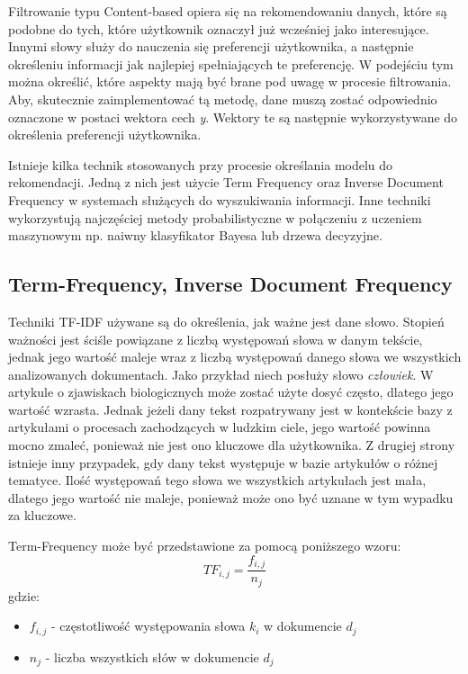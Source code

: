 Filtrowanie typu Content-based opiera się na rekomendowaniu danych, które są podobne do tych, które użytkownik oznaczył już wcześniej jako interesujące. Innymi słowy służy do nauczenia się preferencji użytkownika, a następnie określeniu informacji jak najlepiej spełniających te preferencję. W podejściu tym można określić, które aspekty mają być brane pod uwagę w procesie filtrowania. Aby, skutecznie zaimplementować tą metodę, dane muszą zostać odpowiednio oznaczone w postaci wektora cech \textit{y}. Wektory te są następnie wykorzystywane do określenia preferencji użytkownika.

Istnieje kilka technik stosowanych przy procesie określania modelu do rekomendacji. Jedną z nich jest użycie Term Frequency oraz Inverse Document Frequency w systemach służących do wyszukiwania informacji. Inne techniki wykorzystują najczęściej metody probabilistyczne w połączeniu z uczeniem maszynowym np. naiwny klasyfikator Bayesa lub drzewa decyzyjne.

\subsection{Term-Frequency, Inverse Document Frequency}
Techniki TF-IDF używane są do określenia, jak ważne jest dane słowo. Stopień ważności jest ściśle powiązane z liczbą występowań słowa w danym tekście, jednak jego wartość maleje wraz z liczbą występowań danego słowa we wszystkich analizowanych dokumentach. Jako przykład niech posłuży słowo \textit{człowiek}. W artykule o zjawiskach biologicznych może zostać użyte dosyć często, dlatego jego wartość wzrasta. Jednak jeżeli dany tekst rozpatrywany jest w kontekście bazy z artykułami o procesach zachodzących w ludzkim ciele, jego wartość powinna mocno zmaleć, ponieważ nie jest ono kluczowe dla użytkownika. Z drugiej strony istnieje inny przypadek, gdy dany tekst występuje w bazie artykułów o różnej tematyce. Ilość występowań tego słowa we wszystkich artykułach jest mała, dlatego jego wartość nie maleje, ponieważ może ono być uznane w tym wypadku za kluczowe.

Term-Frequency może być przedstawione za pomocą poniższego wzoru:
\begin{equation}
 TF_{i,j} = \frac{f_{i,j}}{n_j}
\end{equation}
gdzie:
\begin{itemize}
	\item[] $f_{i,j}$ - częstotliwość występowania słowa $k_i$ w dokumencie $d_j$
	\item[] $n_j$ - liczba wszystkich słów w dokumencie $d_j$
\end{itemize}


